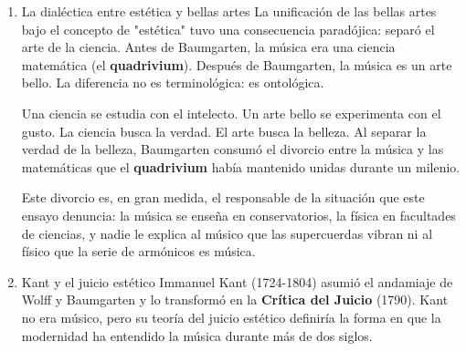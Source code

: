 \documentclass[14pt, a4paper]{article}
\begin{document}
\begin{enumerate}
Antes de Baumgarten, las artes estaban dispersas. La música pertenecía
al \textbf{quadrivium} (junto con la aritmética, la geometría y la
astronomía). La pintura y la escultura eran oficios mecánicos. La
poesía era retórica. Baumgarten unificó estas disciplinas bajo un
nuevo concepto: las bellas artes, cuyo fin no es la utilidad ni la
verdad, sino la belleza.

Pero Baumgarten no definió la estética como una ciencia de la belleza,
sino como una ciencia del conocimiento sensible. La diferencia es
crucial. La belleza era un concepto platónico, objetivo, metafísico.
El conocimiento sensible era un proceso psicológico, subjetivo,
analizable. Baumgarten no preguntó "¿qué es bello?", sino "¿cómo
percibimos lo bello?". Es un giro copernicano: la estética no estudia
el objeto bello, sino el sujeto que percibe.

Desde el materialismo filosófico, este giro es ambiguo. Por un lado,
Baumgarten reconoce la legitimidad del conocimiento sensible (\(M_2\)),
que la tradición racionalista había despreciado. Por otro lado,
inaugura el subjetivismo estético: la belleza deja de ser una
propiedad de la materia (\(M_1\)) para convertirse en una experiencia
del sujeto (\(M_2\)). La estética idealista —que Kant llevará a su
culminación— comienza aquí.
\item La dialéctica entre estética y bellas artes
\label{dialectica-estetica}
La unificación de las bellas artes bajo el concepto de "estética" tuvo
una consecuencia paradójica: separó el arte de la ciencia. Antes de
Baumgarten, la música era una ciencia matemática (el \textbf{quadrivium}).
Después de Baumgarten, la música es un arte bello. La diferencia no es
terminológica: es ontológica.

Una ciencia se estudia con el intelecto. Un arte bello se experimenta
con el gusto. La ciencia busca la verdad. El arte busca la belleza. Al
separar la verdad de la belleza, Baumgarten consumó el divorcio entre
la música y las matemáticas que el \textbf{quadrivium} había mantenido unidas
durante un milenio.

Este divorcio es, en gran medida, el responsable de la situación que
este ensayo denuncia: la música se enseña en conservatorios, la
física en facultades de ciencias, y nadie le explica al músico que las
supercuerdas vibran ni al físico que la serie de armónicos es música.
\item Kant y el juicio estético
\label{kant-estetica}
Immanuel Kant (1724-1804) asumió el andamiaje de Wolff y Baumgarten y
lo transformó en la \textbf{Crítica del Juicio} (1790). Kant no era músico,
pero su teoría del juicio estético definiría la forma en que la
modernidad ha entendido la música durante más de dos siglos.


\end{enumerate}
\end{document}
